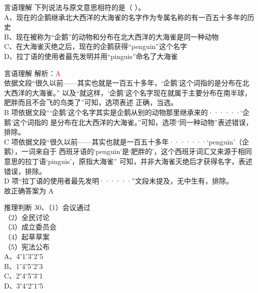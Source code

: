\documentclass[aspectratio=169]{beamer}
\begin{document}
\begin{frame}[t]{言语理解}
    下列说法与原文意思相符的是（ ）。\\
    A、现在的企鹅继承北大西洋的大海雀的名字作为专属名称的有一百五十多年的历史\\
    B、现在被称为“企鹅”的动物和分布在北大西洋的大海雀是同一种动物\\
    C、在大海雀灭绝之后，现在的企鹅获得“penguin”这个名字\\
    D、拉丁语的使用者最先发明并用“pinguis”命名了大海雀\\
\end{frame}

\begin{frame}[t]{言语理解}
    解析：\textcolor{red}{A}\\
    依据文段“很久以前——其实也就是一百五十多年，‘企鹅’这个词指的是分布在北大西洋的大海雀。”
    以及“就这样，‘企鹅’这个名字现在就属于主要分布在南半球，肥胖而且不会飞的鸟类了”可知，选项表述
    正确，当选。\\
    B 项依据文段“‘企鹅’这个名字其实是企鹅从别的动物那里继承来的······‘企鹅’这个词指的
    是分布在北大西洋的大海雀。”可知，选项“同一种动物”表述错误，排除。\\
    C 项依据文段“很久以前——其实也就是一百五十多年·······‘penguin’（企鹅），一词来自于
    西班牙语的‘penguin’是‘肥胖的’，这个西班牙词汇又来源于相同意思的拉丁语‘pinguis’，原指大海雀”
    可知，并非大海雀灭绝后才获得名字，表述错误，排除。\\
    D 项“拉丁语的使用者最先发明······”文段未提及，无中生有，排除。\\
    故正确答案为 A\\
\end{frame}


\begin{frame}[t]{推理判断}
    30、（1）会议通过\\
    （2）全民讨论\\
    （3）成立委员会\\
    （4）起草草案\\
    （5）宪法公布\\
    A、4ˉ1ˉ3ˉ2ˉ5\\
    B、1ˉ4ˉ5ˉ2ˉ3\\
    C、2ˉ4ˉ5ˉ3ˉ1\\
    D、3ˉ4ˉ2ˉ1ˉ5\\
\end{frame}
\end{document}
